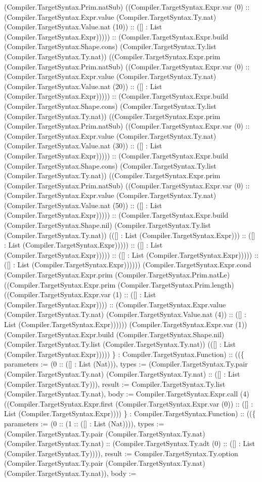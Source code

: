 \documentclass[11pt]{article}
\begin{document}
(Compiler.TargetSyntax.Prim.natSub) ((Compiler.TargetSyntax.Expr.var (0) :: (Compiler.TargetSyntax.Expr.value (Compiler.TargetSyntax.Ty.nat) (Compiler.TargetSyntax.Value.nat (10)) :: ([] : List (Compiler.TargetSyntax.Expr))))) :: (Compiler.TargetSyntax.Expr.build (Compiler.TargetSyntax.Shape.cons) (Compiler.TargetSyntax.Ty.list (Compiler.TargetSyntax.Ty.nat)) ((Compiler.TargetSyntax.Expr.prim (Compiler.TargetSyntax.Prim.natSub) ((Compiler.TargetSyntax.Expr.var (0) :: (Compiler.TargetSyntax.Expr.value (Compiler.TargetSyntax.Ty.nat) (Compiler.TargetSyntax.Value.nat (20)) :: ([] : List (Compiler.TargetSyntax.Expr))))) :: (Compiler.TargetSyntax.Expr.build (Compiler.TargetSyntax.Shape.cons) (Compiler.TargetSyntax.Ty.list (Compiler.TargetSyntax.Ty.nat)) ((Compiler.TargetSyntax.Expr.prim (Compiler.TargetSyntax.Prim.natSub) ((Compiler.TargetSyntax.Expr.var (0) :: (Compiler.TargetSyntax.Expr.value (Compiler.TargetSyntax.Ty.nat) (Compiler.TargetSyntax.Value.nat (30)) :: ([] : List (Compiler.TargetSyntax.Expr))))) :: (Compiler.TargetSyntax.Expr.build (Compiler.TargetSyntax.Shape.cons) (Compiler.TargetSyntax.Ty.list (Compiler.TargetSyntax.Ty.nat)) ((Compiler.TargetSyntax.Expr.prim (Compiler.TargetSyntax.Prim.natSub) ((Compiler.TargetSyntax.Expr.var (0) :: (Compiler.TargetSyntax.Expr.value (Compiler.TargetSyntax.Ty.nat) (Compiler.TargetSyntax.Value.nat (50)) :: ([] : List (Compiler.TargetSyntax.Expr))))) :: (Compiler.TargetSyntax.Expr.build (Compiler.TargetSyntax.Shape.nil) (Compiler.TargetSyntax.Ty.list (Compiler.TargetSyntax.Ty.nat)) (([] : List (Compiler.TargetSyntax.Expr))) :: ([] : List (Compiler.TargetSyntax.Expr))))) :: ([] : List (Compiler.TargetSyntax.Expr))))) :: ([] : List (Compiler.TargetSyntax.Expr))))) :: ([] : List (Compiler.TargetSyntax.Expr)))))) (Compiler.TargetSyntax.Expr.cond (Compiler.TargetSyntax.Expr.prim (Compiler.TargetSyntax.Prim.natLe) ((Compiler.TargetSyntax.Expr.prim (Compiler.TargetSyntax.Prim.length) ((Compiler.TargetSyntax.Expr.var (1) :: ([] : List (Compiler.TargetSyntax.Expr)))) :: (Compiler.TargetSyntax.Expr.value (Compiler.TargetSyntax.Ty.nat) (Compiler.TargetSyntax.Value.nat (4)) :: ([] : List (Compiler.TargetSyntax.Expr)))))) (Compiler.TargetSyntax.Expr.var (1)) (Compiler.TargetSyntax.Expr.build (Compiler.TargetSyntax.Shape.nil) (Compiler.TargetSyntax.Ty.list (Compiler.TargetSyntax.Ty.nat)) (([] : List (Compiler.TargetSyntax.Expr))))) \} : Compiler.TargetSyntax.Function) :: ((\{ parameters := (0 :: ([] : List (Nat))), types := (Compiler.TargetSyntax.Ty.pair (Compiler.TargetSyntax.Ty.nat) (Compiler.TargetSyntax.Ty.nat) :: ([] : List (Compiler.TargetSyntax.Ty))), result := Compiler.TargetSyntax.Ty.list (Compiler.TargetSyntax.Ty.nat), body := Compiler.TargetSyntax.Expr.call (4) ((Compiler.TargetSyntax.Expr.first (Compiler.TargetSyntax.Expr.var (0)) :: ([] : List (Compiler.TargetSyntax.Expr)))) \} : Compiler.TargetSyntax.Function) :: ((\{ parameters := (0 :: (1 :: ([] : List (Nat)))), types := (Compiler.TargetSyntax.Ty.pair (Compiler.TargetSyntax.Ty.nat) (Compiler.TargetSyntax.Ty.nat) :: (Compiler.TargetSyntax.Ty.adt (0) :: ([] : List (Compiler.TargetSyntax.Ty)))), result := Compiler.TargetSyntax.Ty.option (Compiler.TargetSyntax.Ty.pair (Compiler.TargetSyntax.Ty.nat) (Compiler.TargetSyntax.Ty.nat)), body := 
\end{document}
